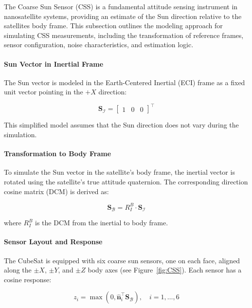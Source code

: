 The Coarse Sun Sensor (CSS) is a fundamental attitude sensing instrument in nanosatellite systems, providing an estimate of the Sun direction relative to the satellites body frame. This subsection outlines the modeling approach for simulating CSS measurements, including the transformation of reference frames, sensor configuration, noise characteristics, and estimation logic.

\paragraph{Sun Vector in Inertial Frame}

The Sun vector is modeled in the Earth-Centered Inertial (ECI) frame as a fixed unit vector pointing in the $+X$ direction:

\begin{equation}
    \mathbf{S}_\mathcal{I} = \begin{bmatrix} 1 & 0 & 0 \end{bmatrix}^\top
\end{equation}

This simplified model assumes that the Sun direction does not vary during the simulation.

\paragraph{Transformation to Body Frame}

To simulate the Sun vector in the satellite’s body frame, the inertial vector is rotated using the satellite's true attitude quaternion. The corresponding direction cosine matrix (DCM) is derived as:

\begin{equation}
     \mathbf{S}_\mathcal{B} = R_I^B \cdot \mathbf{S}_\mathcal{I}
\end{equation}

where $R_I^B$ is the DCM from the inertial to body frame.

\paragraph{Sensor Layout and Response}

The CubeSat is equipped with six coarse sun sensors, one on each face, aligned along the $\pm X$, $\pm Y$, and $\pm Z$ body axes (see Figure~\ref{fig:CSS}). Each sensor has a cosine response:

\begin{equation}
     z_i = \max\left(0, \hat{\mathbf{n}}_i^\top \mathbf{S}_\mathcal{B} \right), \quad i = 1, \dots, 6
\end{equation}

